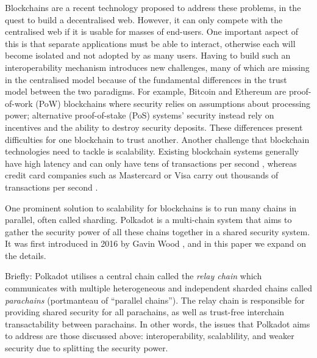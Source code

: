 \documentclass{article}
\begin{document}
Blockchains are a recent technology proposed to address these problems, in the quest to build a decentralised web. However, it can only compete with the centralised web if it is usable for masses of end-users. One important aspect of this is that separate applications must be able to interact, otherwise each will become isolated and not adopted by as many users. Having to build such an interoperability mechanism introduces new challenges, many of which are missing in the centralised model because of the fundamental differences in the trust model between the two paradigms.
For example, Bitcoin\cite{nakamoto2008bitcoin} and Ethereum\cite{buterin2014ethereum} are proof-of-work (PoW) blockchains where security relies on assumptions about processing power; alternative proof-of-stake (PoS) systems' security instead rely on incentives and the ability to destroy security deposits. These differences present difficulties for one blockchain to trust another. Another challenge that blockchain technologies need to tackle is scalability. Existing blockchain systems generally have high latency and can only have tens of transactions per second \cite{scaling}, whereas credit card companies such as Mastercard or Visa carry out thousands of transactions per second \cite{Visa2020}.

One prominent solution to scalability for blockchains is to run many chains in parallel, often called sharding. %
Polkadot is a multi-chain system that aims to gather the security power of all these chains together in a shared security system. It was first introduced in 2016 by Gavin Wood \cite{2016:Wood:Polkadot}, and in this paper we expand on the details.

Briefly: Polkadot utilises a central chain called the \emph{relay chain} which communicates with multiple heterogeneous and independent sharded chains called \emph{parachains} (portmanteau of “parallel chains”). The relay chain is responsible for providing shared security for all parachains, as well as trust-free interchain transactability between parachains. In other words, the issues that Polkadot aims to address are those discussed above: interoperability, scalablility, and weaker security due to splitting the security power.
\end{document}
